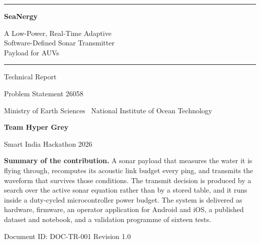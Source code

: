 \documentclass[11pt,a4paper]{article}
\begin{document}
\begin{titlepage}
\centering
\vspace*{22mm}

{\color{ocean}\rule{\linewidth}{1.2pt}}
\vspace{7mm}

{\Huge\bfseries SeaNergy\par}
\vspace{4mm}
{\LARGE A Low-Power, Real-Time Adaptive\\[2mm]
Software-Defined Sonar Transmitter\\[2mm]
Payload for AUVs\par}

\vspace{6mm}
{\color{ocean}\rule{\linewidth}{1.2pt}}

\vspace{16mm}
{\Large Technical Report\par}
\vspace{3mm}
{\large Problem Statement 26058\par}
\vspace{1mm}
{\large Ministry of Earth Sciences \textbar\ National Institute of Ocean Technology\par}

\vspace{20mm}
{\large\bfseries Team Hyper Grey\par}
\vspace{2mm}
{Smart India Hackathon 2026\par}

\vfill
\begin{minipage}{0.86\linewidth}
\small
\textbf{Summary of the contribution.} A sonar payload that measures the water
it is flying through, recomputes its acoustic link budget every ping, and
transmits the waveform that survives those conditions. The transmit decision is
produced by a search over the active sonar equation rather than by a stored
table, and it runs inside a duty-cycled microcontroller power budget. The
system is delivered as hardware, firmware, an operator application for Android
and iOS, a published dataset and notebook, and a validation programme of
sixteen tests.
\end{minipage}

\vspace{12mm}
{\footnotesize Document ID: DOC-TR-001 \quad\textbar\quad Revision 1.0}
\end{titlepage}
\end{document}

